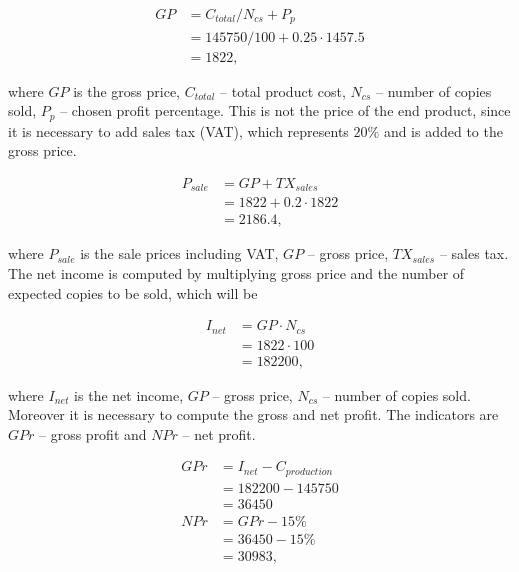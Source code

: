 \documentclass[12pt,a4paper,titlepage]{article}
\begin{document}
\begin{equation}
 \begin{split}
  GP &= C_{total} / N_{cs} + P_{p}\\
              &= 145750/100 + 0.25 \cdot 1457.5\\
              &= 1822,
 \end{split}
\end{equation}

\noindent
where $GP$ is the gross price, $C_{total}$ -- total product cost, $N_{cs}$ -- number of copies sold, $P_{p}$ -- chosen profit percentage. This is not the price of the end product, since it is necessary to add sales tax (VAT), which represents $20\%$ and is added to the gross price. 

\begin{equation}
 \begin{split}
  P_{sale} &= GP + TX_{sales}\\
              &= 1822 + 0.2 \cdot 1822 \\
              &= 2186.4,
 \end{split}
\end{equation}

\noindent
where $P_{sale}$ is the sale prices including VAT, $GP$ -- gross price, $TX_{sales}$ -- sales tax. The net income is computed by multiplying gross price and the number of expected copies to be sold, which will be

\begin{equation}
 \begin{split}
  I_{net} &= GP \cdot N_{cs}\\
              &= 1822 \cdot 100 \\
              &= 182200,
 \end{split}
\end{equation}

\noindent
where $I_{net}$ is the net income, $GP$ -- gross price, $N_{cs}$ -- number of copies sold. Moreover it is necessary to compute the gross and net profit. The indicators are $GPr$ -- gross profit and $NPr$ -- net profit.

\begin{equation}
 \begin{split}
  GPr &= I_{net} - C_{production}\\
              &= 182200 - 145750\\
              &= 36450\\
  NPr &= GPr - 15\% \\
             &= 36450 - 15\% \\
             &= 30983,
 \end{split}
\end{equation}
\end{document}
